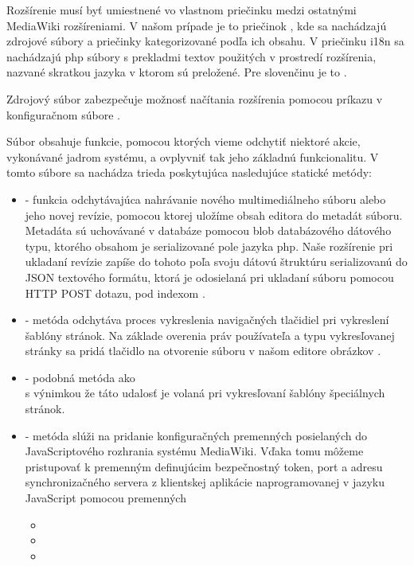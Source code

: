 Rozšírenie musí byť umiestnené vo vlastnom priečinku medzi ostatnými MediaWiki rozšíreniami. V našom prípade je to priečinok , kde sa nachádzajú zdrojové súbory a priečinky kategorizované podľa ich obsahu. V priečinku i18n sa nachádzajú php súbory s prekladmi textov použitých v prostredí rozšírenia, nazvané skratkou jazyka v ktorom sú preložené. Pre slovenčinu je to .

Zdrojový súbor  zabezpečuje možnosť načítania rozšírenia pomocou príkazu  v konfiguračnom súbore .

Súbor  obsahuje funkcie, pomocou ktorých vieme odchytiť niektoré akcie, vykonávané jadrom systému, a ovplyvniť tak jeho základnú funkcionalitu. V tomto súbore sa nachádza trieda  poskytujúca nasledujúce statické metódy:

\begin{itemize}
	\item {} - funkcia odchytávajúca nahrávanie nového multimediálneho súboru alebo jeho novej revízie, pomocou ktorej uložíme obsah editora do metadát súboru. Metadáta sú uchovávané v databáze pomocou blob databázového dátového typu, ktorého obsahom je serializované pole jazyka php. Naše rozšírenie pri ukladaní revízie zapíše do tohoto poľa svoju dátovú štruktúru serializovanú do JSON textového formátu, ktorá je odosielaná pri ukladaní súboru pomocou HTTP POST dotazu, pod indexom .
	
	\item {} - metóda odchytáva proces vykreslenia navigačných tlačidiel pri vykreslení šablóny stránok. Na základe overenia práv používateľa a typu vykresľovanej stránky sa pridá tlačidlo na otvorenie súboru v našom editore obrázkov .
	
	\item {} - podobná metóda ako \\
	 s výnimkou že táto udalosť je volaná pri vykresľovaní šablóny špeciálnych stránok.
	
	\item {} - metóda slúži na pridanie konfiguračných premenných posielaných do JavaScriptového rozhrania systému MediaWiki. Vďaka tomu môžeme pristupovať k premenným definujúcim bezpečnostný token, port a adresu synchronizačného servera z klientskej aplikácie naprogramovanej v jazyku JavaScript pomocou premenných 
	\begin{itemize}
		\item {}
		\item {}
		\item {}
	\end{itemize}
\end{itemize}

